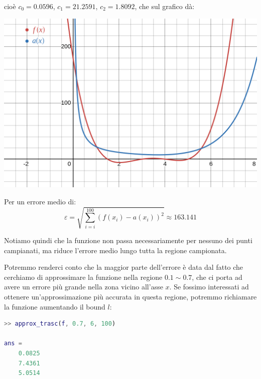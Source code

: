 \documentclass[a4paper,11pt]{article}
\begin{document}
\begin{minipage}{\textwidth}
cioè $c_0 = 0.0596$, $c_1 = 21.2591$, $c_2 = 1.8092$, che sul grafico dà:
\begin{center}
	\includegraphics[scale = 0.28]{../figures/trasc_approx.png}
\end{center}
\end{minipage}

\par\medskip

Per un errore medio di:
$$
\varepsilon = \sqrt{\sum_{i = i}^{100} \left( f(x_i) - a(x_i) \right)^2} \approx 163.141
$$

Notiamo quindi che la funzione non passa necessariamente per nessuno dei punti campianati, ma riduce l'errore medio lungo tutta la regione campionata.

Potremmo renderci conto che la maggior parte dell'errore è data dal fatto che cerchiamo di approssimare la funzione nella regione $0.1 \sim 0.7$, che ci porta ad avere un errore più grande nella zona vicino all'asse $x$.
Se fossimo interessati ad ottenere un'approssimazione più accurata in questa regione, potremmo richiamare la funzione aumentando il bound $l$:
\begin{lstlisting}[language=matlab, style=codestyle]	
>> approx_trasc(f, 0.7, 6, 100)

ans =
    0.0825
    7.4361
    5.0514
\end{lstlisting}

\par\medskip
\noindent
\end{document}
